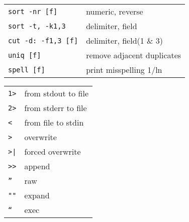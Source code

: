 \documentclass[10pt]{article}
\begin{document}
\begin{multicols*}{2}
\begin{tcolorbox}[halign=left]
\begin{tabular}{p{85pt}|p{120pt}}
            \texttt{sort -nr [f]}       & numeric, reverse           \\
            \texttt{sort -t, -k1,3 }    & delimiter, field           \\

            \texttt{cut -d: -f1,3 [f]}  & delimiter, field(1 \& 3)   \\

            \texttt{uniq [f]}           & remove adjacent duplicates \\
            \texttt{spell [f]}          & print misspelling 1/ln     \\

        \end{tabular}
    \end{tcolorbox}

    \begin{tcolorbox}[halign=center]
        \begin{tabular}{p{85pt}|p{120pt}}
            \texttt{1>} & from stdout to file \\
            \texttt{2>} & from stderr to file \\
            \texttt{<}  & from file to stdin  \\
            \texttt{>}  & overwrite           \\
            \texttt{>|} & forced overwrite    \\
            \texttt{>>} & append              \\
            \texttt{''} & raw                 \\
            \texttt{""} & expand              \\
            \texttt{``} & exec                \\
        \end{tabular}
    \end{tcolorbox}


\end{multicols*}
\end{document}
